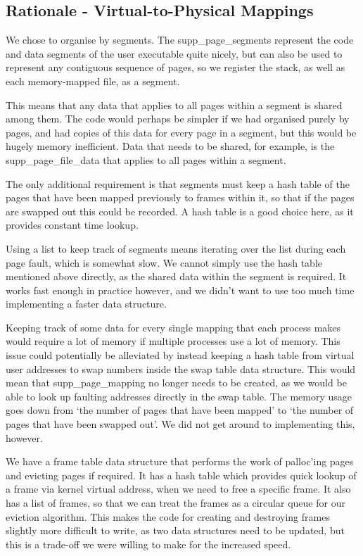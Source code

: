 \subsection{Rationale - Virtual-to-Physical Mappings}


We chose to organise by segments. The supp\_page\_segments represent the code
and data segments of the user executable quite nicely, but can also be used to
represent any contiguous sequence of pages, so we register the stack, as well as
each memory-mapped file, as a segment.

This means that any data that applies to all pages within a segment is shared
among them. The code would perhaps be simpler if we had organised purely by
pages, and had copies of this data for every page in a segment, but this would
be hugely memory inefficient. Data that needs to be shared, for example, is the
supp\_page\_file\_data that applies to all pages within a segment.

The only additional requirement is that segments must keep a hash table of the
pages that have been mapped previously to frames within it, so that if the pages
are swapped out this could be recorded. A hash table is a good choice here, as
it provides constant time lookup.

Using a list to keep track of segments means iterating over the list during each
page fault, which is somewhat slow. We cannot simply use the hash table
mentioned above directly, as the shared data within the segment is required. It
works fast enough in practice however, and we didn't want to use too much time
implementing a faster data structure.

Keeping track of some data for every single mapping that each process makes
would require a lot of memory if multiple processes use a lot of memory. This
issue could potentially be alleviated by instead keeping a hash table from
virtual user addresses to swap numbers inside the swap table data
structure. This would mean that supp\_page\_mapping no longer needs to be
created, as we would be able to look up faulting addresses directly in the swap
table.  The memory usage goes down from `the number of pages that have been
mapped' to `the number of pages that have been swapped out'. We did not get
around to implementing this, however.

We have a frame table data structure that performs the work of palloc'ing pages
and evicting pages if required. It has a hash table which provides quick lookup
of a frame via kernel virtual address, when we need to free a specific frame. It
also has a list of frames, so that we can treat the frames as a circular queue
for our eviction algorithm. This makes the code for creating and destroying
frames slightly more difficult to write, as two data structures need to be
updated, but this is a trade-off we were willing to make for the increased
speed.

